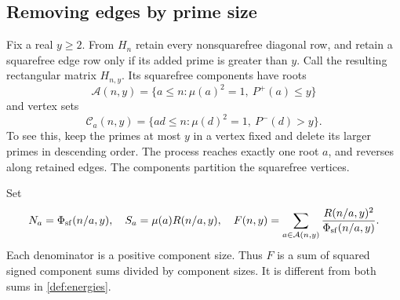 \subsection{Removing edges by prime size}

Fix a real $y\ge2$. From $H_n$ retain every nonsquarefree diagonal row, and retain a squarefree edge row only if its added prime is greater than $y$. Call the resulting rectangular matrix $H_{n,y}$. Its squarefree components have roots
\[
 \mathcal A(n,y)=\{a\le n:\mu(a)^2=1,\ P^+(a)\le y\}
\]
and vertex sets
\[
 \mathcal C_a(n,y)=\{ad\le n:\mu(d)^2=1,\ P^-(d)>y\}.
\]
To see this, keep the primes at most $y$ in a vertex fixed and delete its larger primes in descending order. The process reaches exactly one root $a$, and reverses along retained edges. The components partition the squarefree vertices.

Set
\begin{equation}\label{geo:F}
 N_a=\Phi_{\mathrm{sf}}(n/a,y),\quad S_a=\mu(a)R(n/a,y),\quad
 F(n,y)=\sum_{a\in\mathcal A(n,y)}\frac{R(n/a,y)^2}{\Phi_{\mathrm{sf}}(n/a,y)}.
\end{equation}
Each denominator is a positive component size. Thus $F$ is a sum of squared signed component sums divided by component sizes. It is different from both sums in \eqref{def:energies}.

